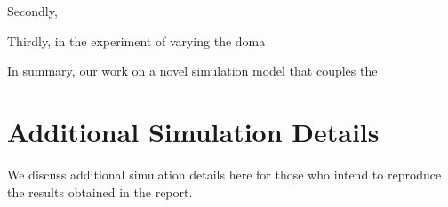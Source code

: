 \documentclass[12pt]{article}
\begin{document}
Secondly, 

Thirdly, in the experiment of varying the doma

In summary, our work on a novel simulation model that couples the 

\pagebreak





\appendix
\section{Additional Simulation Details}
We discuss additional simulation details here for those who intend to reproduce the results obtained in the report.
\end{document}
